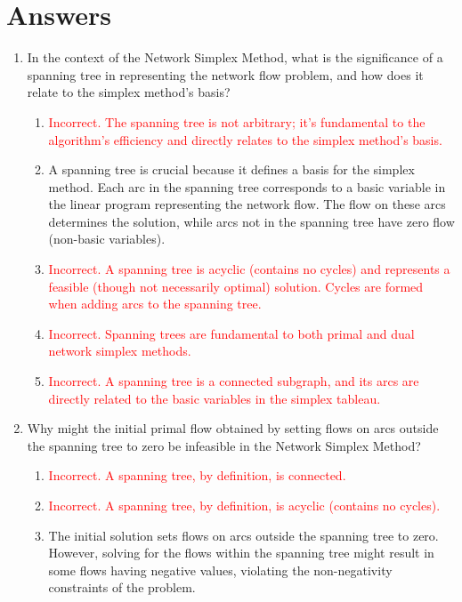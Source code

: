 \documentclass{article}%
\newcommand{\incorrect}[1]{\textcolor{red}{#1}}
\begin{document}
\section{Answers}%
\label{sec:Answers}%
\begin{enumerate}%
\item In the context of the Network Simplex Method, what is the significance of a spanning tree in representing the network flow problem, and how does it relate to the simplex method's basis?%
\begin{enumerate}%
\item \incorrect{Incorrect. The spanning tree is not arbitrary; it's fundamental to the algorithm's efficiency and directly relates to the simplex method's basis.}%
\item A spanning tree is crucial because it defines a basis for the simplex method.  Each arc in the spanning tree corresponds to a basic variable in the linear program representing the network flow.  The flow on these arcs determines the solution, while arcs not in the spanning tree have zero flow (non-basic variables).%
\item \incorrect{Incorrect. A spanning tree is acyclic (contains no cycles) and represents a feasible (though not necessarily optimal) solution.  Cycles are formed when adding arcs to the spanning tree.}%
\item \incorrect{Incorrect. Spanning trees are fundamental to both primal and dual network simplex methods.}%
\item \incorrect{Incorrect. A spanning tree is a connected subgraph, and its arcs are directly related to the basic variables in the simplex tableau.}%
\end{enumerate}%
\vspace{1em}%
\item Why might the initial primal flow obtained by setting flows on arcs outside the spanning tree to zero be infeasible in the Network Simplex Method?%
\begin{enumerate}%
\item \incorrect{Incorrect. A spanning tree, by definition, is connected.}%
\item \incorrect{Incorrect. A spanning tree, by definition, is acyclic (contains no cycles).}%
\item The initial solution sets flows on arcs outside the spanning tree to zero.  However, solving for the flows within the spanning tree might result in some flows having negative values, violating the non-negativity constraints of the problem.%

\end{enumerate}
\end{enumerate}
\end{document}
